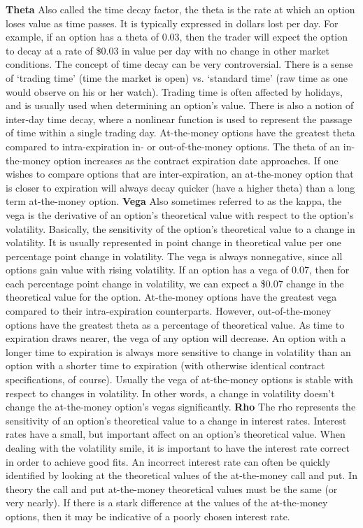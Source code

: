\documentclass[12pt, a4paper, notitlepage]{article}
\numberwithin{equation}{subsection}
\numberwithin{figure}{subsection}
\numberwithin{table}{subsection}
\newcommand{\newpar}{\newline \newline}
\begin{document}
\newpar
\textbf{Theta} \newline
Also called the time decay factor, the theta is the rate at which an option loses value as time passes.  It is typically expressed in dollars lost per day.  For example, if an option has a theta of 0.03, then the trader will expect the option to decay at a rate of \$0.03 in value per day with no change in other market conditions.
\newpar
The concept of time decay can be very controversial.  There is a sense of `trading time' (time the market is open) vs. `standard time' (raw time as one would observe on his or her watch).  Trading time is often affected by holidays, and is usually used when determining an option's value.  There is also a notion of inter-day time decay, where a nonlinear function is used to represent the passage of time within a single trading day.
\newpar
At-the-money options have the greatest theta compared to intra-expiration in- or out-of-the-money options.  The theta of an in-the-money option increases as the contract expiration date approaches.  If one wishes to compare options that are inter-expiration, an at-the-money option that is closer to expiration will always decay quicker (have a higher theta) than a long term at-the-money option.
\newpar
\textbf{Vega} \newline
Also sometimes referred to as the kappa, the vega is the derivative of an option's theoretical value with respect to the option's volatility.  Basically, the sensitivity of the option's theoretical value to a change in volatility.  It is usually represented in point change in theoretical value per one percentage point change in volatility.  The vega is always nonnegative, since all options gain value with rising volatility.  If an option has a vega of 0.07, then for each percentage point change in volatility, we can expect a \$0.07 change in the theoretical value for the option.
\newpar
At-the-money options have the greatest vega compared to their intra-expiration counterparts.  However, out-of-the-money options have the greatest theta as a percentage of theoretical value.  As time to expiration draws nearer, the vega of any option will decrease.  An option with a longer time to expiration is always more sensitive to change in volatility than an option with a shorter time to expiration (with otherwise identical contract specifications, of course).  Usually the vega of at-the-money options is stable with respect to changes in volatility.  In other words, a change in volatility doesn't change the at-the-money option's vegas significantly.
\newpar
\textbf{Rho}\newline
The rho represents the sensitivity of an option's theoretical value to a change in interest rates.  Interest rates have a small, but important affect on an option's theoretical value.  When dealing with the volatility smile, it is important to have the interest rate correct in order to achieve good fits.  An incorrect interest rate can often be quickly identified by looking at the theoretical values of the at-the-money call and put.  In theory the call and put at-the-money theoretical values must be the same (or very nearly).  If there is a stark difference at the values of the at-the-money options, then it may be indicative of a poorly chosen interest rate.
\end{document}
